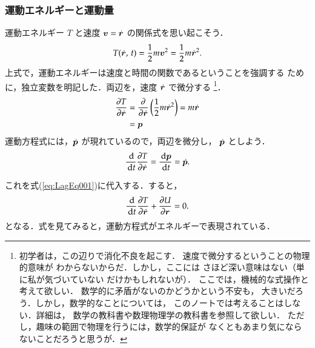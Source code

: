             \subsubsection{運動エネルギーと運動量}
            運動エネルギー $T$ と速度 $\boldsymbol{v} = \dot{\boldsymbol{r}}$ の関係式を思い起こそう．
                \begin{align}
                    T(\dot{\boldsymbol{r}},\,t) = \frac{1}{2} m{\boldsymbol{v}}^{2} = \frac{1}{2} m{\dot{\boldsymbol{r}}}^{2}.
                \end{align}
            上式で，運動エネルギーは速度と時間の関数であるということを強調する
            ために，独立変数を明記した．両辺を，速度 $\dot{\boldsymbol{r}}$ で微分する
                \footnote{
                    初学者は，この辺りで消化不良を起こす．
                    速度で微分するということの物理的意味が
                    わからないからだ．しかし，ここには
                    さほど深い意味はない（単に私が気づいていない
                    だけかもしれないが）．
                    ここでは，機械的な式操作と考えて欲しい．
                    数学的に矛盾がないのかどうかという不安も，
                    大きいだろう．しかし，数学的なことについては，
                    このノートでは考えることはしない．詳細は，
                    数学の教科書や数理物理学の教科書を参照して欲しい．
                    ただし，趣味の範囲で物理を行うには，数学的保証が
                    なくともあまり気にならないことだろうと思うが．
                }．
                \begin{align}
                    \frac{\partial T}{\partial \dot{\boldsymbol{r}}} &= \frac{\partial}{\partial \dot{\boldsymbol{r}}}
                                                    \left(
                                                        \frac{1}{2} m{\dot{\boldsymbol{r}}}^{2}
                                                    \right)
                                                = m{\dot{\boldsymbol{r}}}
                                                \notag \\
                                                &= \boldsymbol{p}
                \end{align}
                運動方程式には，$\dot{\boldsymbol{p}}$ が現れているので，両辺を微分し，
                $\dot{\boldsymbol{p}}$ としよう．
                \begin{align}
                    \frac{\,\mathrm{d}}{\,\mathrm{d} t}\frac{\partial T}{\partial \dot{\boldsymbol{r}}}
                    = \frac{\,\mathrm{d} \boldsymbol{p}}{\,\mathrm{d} t}
                    = \dot{\boldsymbol{p}}.
                \end{align}

            これを式(\ref{eq:LagEq001})に代入する．すると，
                \begin{align}\label{eq:LagEq002}
                   \frac{\df}{\df t}\frac{\rd T}{\rd \dot{\br}} + \frac{\rd U}{\rd \br} = 0.
                \end{align}
            となる．式を見てみると，運動方程式がエネルギーで表現されている．

